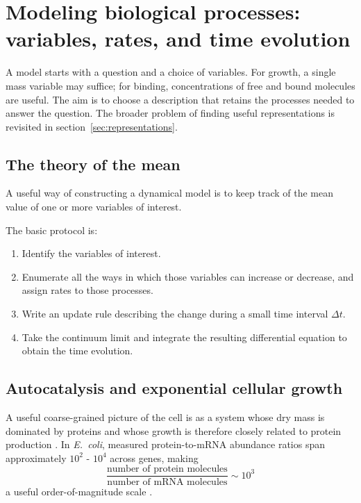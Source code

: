 \clearpage
\section{Modeling biological processes: variables, rates, and time evolution}
\label{sec:rates}
A model starts with a question and a choice of variables.
For growth, a single mass variable may suffice; for binding, concentrations of free and bound molecules are useful.
The aim is to choose a description that retains the processes needed to answer the question.
The broader problem of finding useful representations is revisited in section~\ref{sec:representations}.
\subsection{The theory of the mean}
\label{sec:mean}



A useful way of constructing a dynamical model is to keep track of the mean value of one or more variables of interest.

The basic protocol is:

\begin{enumerate}
    \item Identify the variables of interest.
    \item Enumerate all the ways in which those variables can increase or decrease, and assign rates to those processes.
    \item Write an update rule describing the change during a small time interval $\Delta t$.
    \item Take the continuum limit and integrate the resulting differential equation to obtain the time evolution.
\end{enumerate}



\subsection{Autocatalysis and exponential cellular growth}
\label{sec:growth}



A useful coarse-grained picture of the cell is as a system whose dry mass is dominated by proteins and whose growth is therefore closely related to protein production \cite{milo2013total}.
In \textit{E.~coli}, measured protein-to-mRNA abundance ratios span approximately $10^2$ - $10^4$ across genes, making
\[
    \frac{\text{number of protein molecules}}{\text{number of mRNA molecules}} \sim 10^3
\]
a useful order-of-magnitude scale \cite{taniguchi2010quantifying}.

